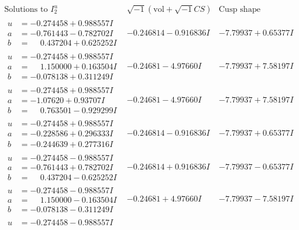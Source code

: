 \documentclass[1p]{elsarticle_modified}
\theoremstyle{definition}
\newcommand{\I}{\sqrt{-1}}
\begin{document}
$$\begin{array}{c|c|c}  
\text{Solutions to }I^u_{2}& \I (\text{vol} + \sqrt{-1}CS) & \text{Cusp shape}\\
 \hline 
\begin{aligned}
u &= -0.274458 + 0.988557 I \\
a &= -0.761443 - 0.782702 I \\
b &= \phantom{-}0.437204 + 0.625252 I\end{aligned}
 & -0.246814 - 0.916836 I & -7.79937 + 0.65377 I \\ \hline\begin{aligned}
u &= -0.274458 + 0.988557 I \\
a &= \phantom{-}1.150000 + 0.163504 I \\
b &= -0.078138 + 0.311249 I\end{aligned}
 & -0.24681 - 4.97660 I & -7.79937 + 7.58197 I \\ \hline\begin{aligned}
u &= -0.274458 + 0.988557 I \\
a &= -1.07620 + 0.93707 I \\
b &= \phantom{-}0.763501 - 0.929299 I\end{aligned}
 & -0.24681 - 4.97660 I & -7.79937 + 7.58197 I \\ \hline\begin{aligned}
u &= -0.274458 + 0.988557 I \\
a &= -0.228586 + 0.296333 I \\
b &= -0.244639 + 0.277316 I\end{aligned}
 & -0.246814 - 0.916836 I & -7.79937 + 0.65377 I \\ \hline\begin{aligned}
u &= -0.274458 - 0.988557 I \\
a &= -0.761443 + 0.782702 I \\
b &= \phantom{-}0.437204 - 0.625252 I\end{aligned}
 & -0.246814 + 0.916836 I & -7.79937 - 0.65377 I \\ \hline\begin{aligned}
u &= -0.274458 - 0.988557 I \\
a &= \phantom{-}1.150000 - 0.163504 I \\
b &= -0.078138 - 0.311249 I\end{aligned}
 & -0.24681 + 4.97660 I & -7.79937 - 7.58197 I \\ \hline\begin{aligned}
u &= -0.274458 - 0.988557 I \\

\end{aligned}
\end{array}$$
\end{document}
